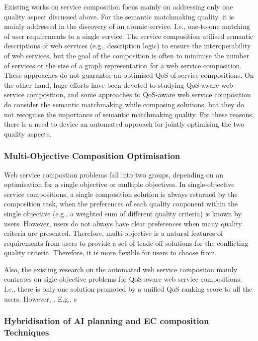 Existing works on service composition focus mainly on addressing only one quality aspect discussed above. For the semantic matchmaking quality, it is mainly addressed in the discovery of an atomic service. I.e., one-to-one matching of user requirements to a single service. The service composition \cite{bansal2016generalized,boustil2014semantic,mier2015integrated} utilised semantic descriptions of web services (e.g., description logic) to ensure the interoperability of web services, but the goal of the composition is often to minimise the number of services or the size of a graph representation for a web service composition. These approaches do not guarantee an optimised QoS of service compositions. On the other hand, huge efforts have been devoted to studying QoS-aware web service composition, and some approaches to QoS-aware web service composition do consider the semantic matchmaking while composing solutions, but they do not recognise the importance of semantic matchmaking quality. For these reasons, there is a need to device an automated approach for jointly optimising the two quality aspects.


\subsubsection{Multi-Objective Composition Optimisation}
Web service compostion problems fall into two groups, depending on an optimisation for a single objective or multiple objectives. In single-objective service compositions, a single composition solution is always returned by the composition task, when the preferences of each quality conponent within the single objective (e.g., a weighted sum of different quality criteria) is known by users. However, users do not always have clear preferences when many quality criteria are presented. Therefore, multi-objective is a natural features of requirements from users to provide a set of trade-off solutions for the conflicting quality criteria. Therefore, it is more flexible for users to choose from.

Also, the existing research on the automated web service compostion mainly contrates on sigle objective problems for QoS-aware web service compositions. I.e., there is only one solution promoted by a unified QoS ranking score  to all the users. However, . E.g., s



\subsubsection{Hybridisation of AI planning and EC composition Techniques}





